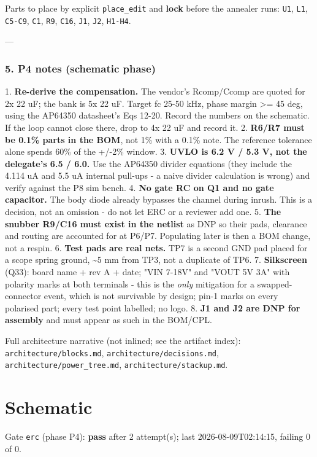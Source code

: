 \documentclass[11pt,a4paper]{article}
\begin{document}
Parts to place by explicit \texttt{place\_edit} and \textbf{lock} before the annealer runs: \texttt{U1}, \texttt{L1}, \texttt{C5-C9}, \texttt{C1}, \texttt{R9}, \texttt{C16}, \texttt{J1}, \texttt{J2}, \texttt{H1-H4}.

---

\subsubsection*{5. P4 notes (schematic phase)}
1. \textbf{Re-derive the compensation.} The vendor's Rcomp/Ccomp are quoted for 2x 22 uF; the bank is 5x 22 uF. Target fc 25-50 kHz, phase margin \textgreater{}= 45 deg, using the AP64350 datasheet's Eqs 12-20. Record the numbers on the schematic. If the loop cannot close there, drop to 4x 22 uF and record it. 2. \textbf{R6/R7 must be 0.1\% parts in the BOM}, not 1\% with a 0.1\% note. The reference tolerance alone spends 60\% of the +/-2\% window. 3. \textbf{UVLO is 6.2 V / 5.3 V, not the delegate's 6.5 / 6.0.} Use the AP64350 divider equations (they include the 4.114 uA and 5.5 uA internal pull-ups - a naive divider calculation is wrong) and verify against the P8 sim bench. 4. \textbf{No gate RC on Q1 and no gate capacitor.} The body diode already bypasses the channel during inrush. This is a decision, not an omission - do not let ERC or a reviewer add one. 5. \textbf{The snubber R9/C16 must exist in the netlist} as DNP so their pads, clearance and routing are accounted for at P6/P7. Populating later is then a BOM change, not a respin. 6. \textbf{Test pads are real nets.} TP7 is a second GND pad placed for a scope spring ground, \textasciitilde{}5 mm from TP3, not a duplicate of TP6. 7. \textbf{Silkscreen} (Q33): board name + rev A + date; "VIN 7-18V" and "VOUT 5V 3A" with polarity marks at both terminals - this is the \emph{only} mitigation for a swapped-connector event, which is not survivable by design; pin-1 marks on every polarised part; every test point labelled; no logo. 8. \textbf{J1 and J2 are DNP for assembly} and must appear as such in the BOM/CPL.

Full architecture narrative (not inlined; see the artifact index): \texttt{architecture/blocks.md}, \texttt{architecture/decisions.md}, \texttt{architecture/power\_tree.md}, \texttt{architecture/stackup.md}.
\section{Schematic}
Gate \texttt{erc} (phase P4): \textbf{pass} after 2 attempt(s); last 2026-08-09T02:14:15, failing 0 of 0.
\end{document}
